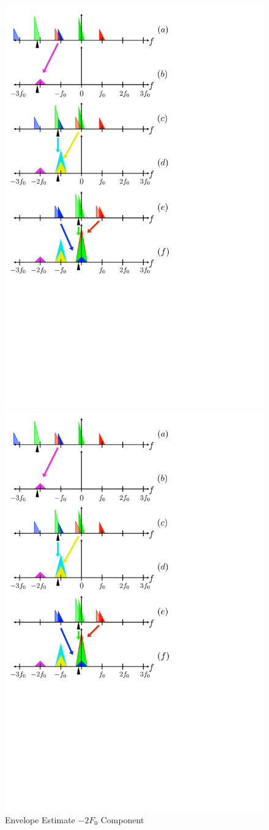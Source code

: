 \documentclass [11pt, proquest,oneside] {uwthesis}[2015/03/03]
\begin{document}
\begin{figure}[!ht]
   \centering
    \includegraphics[width=.62\textwidth]{harmonic_envelope_2F0}   
    \caption{Envelope Estimate $-2F_0$ Component}\label{fig:harmonic_envelope_2F0}
    \includegraphics[width=.62\textwidth]{harmonic_envelope_F0} 

\end{figure}
\end{document}
